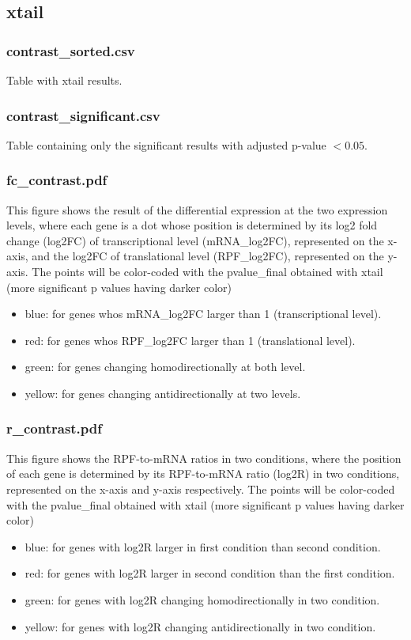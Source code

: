 \documentclass[10pt,a4paper]{article}
\begin{document}
\subsection*{xtail}
\subsubsection*{contrast\_sorted.csv}
Table with xtail results.
\subsubsection*{contrast\_significant.csv}
Table containing only the significant results with adjusted p-value $< 0.05$.
\subsubsection*{fc\_contrast.pdf}
This figure shows the result of the differential expression at the two expression
levels, where each gene is a dot whose position is determined by its log2 fold change (log2FC) of
transcriptional level (mRNA\_log2FC), represented on the x-axis, and the log2FC of translational level
(RPF\_log2FC), represented on the y-axis.
The points will be color-coded with the pvalue\_final obtained with xtail (more
significant p values having darker color)
\begin{itemize}[noitemsep]
\item blue: for genes whos mRNA\_log2FC larger than 1 (transcriptional level).
\item red: for genes whos RPF\_log2FC larger than 1 (translational level).
\item green: for genes changing homodirectionally at both level.
\item yellow: for genes changing antidirectionally at two levels.
\end{itemize}
\subsubsection*{r\_contrast.pdf}
This figure shows the RPF-to-mRNA ratios in two conditions, where the
position of each gene is determined by its RPF-to-mRNA ratio (log2R) in two conditions, represented
on the x-axis and y-axis respectively.
The points will be color-coded with the pvalue\_final obtained with xtail (more
significant p values having darker color)
\begin{itemize}[noitemsep]
\item blue: for genes with log2R larger in first condition than second condition.
\item red: for genes with log2R larger in second condition than the first condition.
\item green: for genes with log2R changing homodirectionally in two condition.
\item yellow: for genes with log2R changing antidirectionally in two condition.
\end{itemize}
\end{document}
